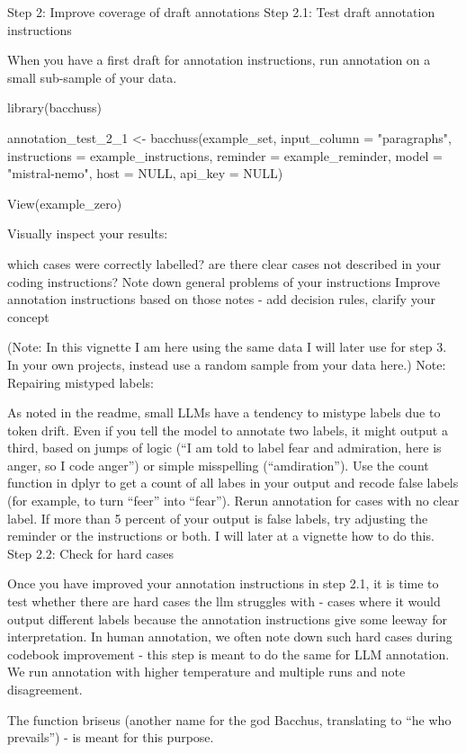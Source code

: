 \documentclass[11pt,titlepage,oneside,openany]{article}
\begin{document}
\begin{itemize}
Step 2: Improve coverage of draft annotations
Step 2.1: Test draft annotation instructions

When you have a first draft for annotation instructions, run annotation on a small sub-sample of your data.

library(bacchuss)

annotation_test_2_1 <- bacchuss(example_set, input_column = "paragraphs",
                        instructions = example_instructions,
                        reminder = example_reminder,
                        model = "mistral-nemo",
                        host = NULL,
                        api_key = NULL)

View(example_zero)

Visually inspect your results:

    which cases were correctly labelled?
    are there clear cases not described in your coding instructions?
    Note down general problems of your instructions
    Improve annotation instructions based on those notes - add decision rules, clarify your concept

(Note: In this vignette I am here using the same data I will later use for step 3. In your own projects, instead use a random sample from your data here.)
Note: Repairing mistyped labels:

As noted in the readme, small LLMs have a tendency to mistype labels due to token drift. Even if you tell the model to annotate two labels, it might output a third, based on jumps of logic (“I am told to label fear and admiration, here is anger, so I code anger”) or simple misspelling (“amdiration”). Use the count function in dplyr to get a count of all labes in your output and recode false labels (for example, to turn “feer” into “fear”). Rerun annotation for cases with no clear label. If more than 5 percent of your output is false labels, try adjusting the reminder or the instructions or both. I will later at a vignette how to do this.
Step 2.2: Check for hard cases

Once you have improved your annotation instructions in step 2.1, it is time to test whether there are hard cases the llm struggles with - cases where it would output different labels because the annotation instructions give some leeway for interpretation. In human annotation, we often note down such hard cases during codebook improvement - this step is meant to do the same for LLM annotation. We run annotation with higher temperature and multiple runs and note disagreement.

The function briseus (another name for the god Bacchus, translating to “he who prevails”) - is meant for this purpose.


\end{itemize}
\end{document}
